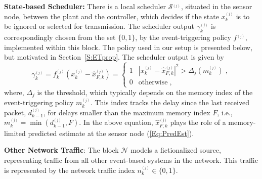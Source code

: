 \documentclass[journal]{IEEEtran}
\begin{document}
\noindent \textbf{State-based Scheduler: } There is a local scheduler $\mathcal{S}^{_{(j)}}$, situated in the sensor node, between the plant and the controller, which decides if the state $x^{_{(j)}}_k$ is to be ignored or selected for transmission. The scheduler output $\gamma^{_{(j)}}_k$ is correspondingly chosen from the set $\{0,1\}$, by the event-triggering policy $f^{_{(j)}}$, implemented within this block. The policy used in our setup is presented below, but motivated in Section~\ref{S:ETprop}. The scheduler output is given by
\begin{equation}
\gamma^{_{(j)}}_k = f^{_{(j)}}_k(x^{_{(j)}}_k-\hat{x}^{_{(j)}}_{F,k}) = \begin{cases}
1 & |x^{_{(j)}}_k-\hat{x}^{_{(j)}}_{F,k}|^2 > \Delta_{j}(m^{_{(j)}}_k) \; , \\
0 & \textrm{otherwise} \; ,
\end{cases} \label{Eq:InnoSched}
\end{equation}
where, $\Delta_{j}$ is the threshold, which typically depends on the memory index of the event-triggering policy $m^{_{(j)}}_{k}$. This index tracks the delay since the last received packet, $d^{_{(j)}}_{k-1}$, for delays smaller than the maximum memory index $F$, i.e., $m^{_{(j)}}_{k}= \min(d^{_{(j)}}_{k-1},F)$. In the above equation, $\hat{x}^{_{(j)}}_{F,k}$ plays the role of a memory-limited predicted estimate at the sensor node (\ref{Eq:PredEst}).

\noindent \textbf{Other Network Traffic}: The block $\mathcal{N}$ models a fictionalized source, representing traffic from all other event-based systems in the network. This traffic is represented by the network traffic index $n_k^{_{(j)}} \in \{0,1\}$.
\end{document}

